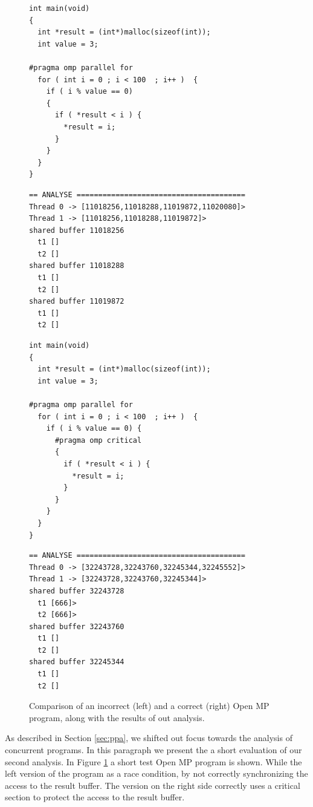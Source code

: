 \begin{figure}
  \centering
  \lstset{language=C, basicstyle=\small}

  \begin{minipage}{.45\textwidth}
    \begin{lstlisting}
int main(void) 
{
  int *result = (int*)malloc(sizeof(int));
  int value = 3;
  
#pragma omp parallel for 
  for ( int i = 0 ; i < 100  ; i++ )  {
    if ( i % value == 0) 
    {
      if ( *result < i ) {
        *result = i;
      }
    }
  }
}
    \end{lstlisting}
    \lstset{basicstyle=\scriptsize}
    \begin{lstlisting}
== ANALYSE =======================================
Thread 0 -> [11018256,11018288,11019872,11020080]>
Thread 1 -> [11018256,11018288,11019872]>
shared buffer 11018256
  t1 []
  t2 []
shared buffer 11018288
  t1 []
  t2 []
shared buffer 11019872
  t1 []
  t2 []
    \end{lstlisting}
  \end{minipage}
  \hspace{.025\textwidth}
  \hspace{.025\textwidth}
  \begin{minipage}{.45\textwidth}
    \begin{lstlisting}
int main(void) 
{
  int *result = (int*)malloc(sizeof(int));
  int value = 3;
  
#pragma omp parallel for 
  for ( int i = 0 ; i < 100  ; i++ )  {
    if ( i % value == 0) {
      #pragma omp critical 
      {
        if ( *result < i ) {
          *result = i;
        }
      }
    }
  }
}
    \end{lstlisting}
    \lstset{basicstyle=\scriptsize}
    \begin{lstlisting}
== ANALYSE =======================================
Thread 0 -> [32243728,32243760,32245344,32245552]>
Thread 1 -> [32243728,32243760,32245344]>
shared buffer 32243728
  t1 [666]>
  t2 [666]>
shared buffer 32243760
  t1 []
  t2 []
shared buffer 32245344
  t1 []
  t2 []
    \end{lstlisting}
  \end{minipage}
  \caption{Comparison of an incorrect (left) and a correct (right)
    Open MP program, along with the results of out analysis.}
  \label{fig:openmp}
\end{figure}



As described in Section \ref{sec:ppa}, we shifted out focus towards
the analysis of concurrent programs. In this paragraph we present the
a short evaluation of our second analysis. In Figure \ref{fig:openmp}
a short test Open MP program is shown. While the left version of the
program as a race condition, by not correctly synchronizing the access
to the result buffer. The version on the right side correctly uses a
critical section to protect the access to the result buffer.


